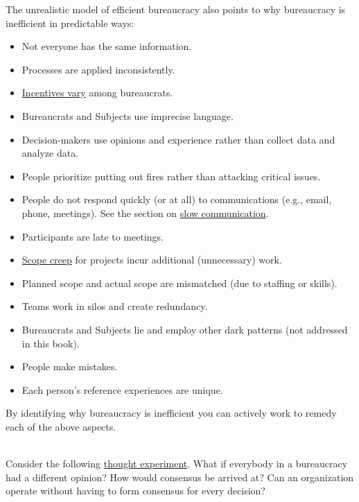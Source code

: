 The unrealistic model of efficient bureaucracy also points to why bureaucracy is inefficient in predictable ways:
\begin{itemize}
    \item Not everyone has the same information.
    \item Processes are applied inconsistently.
    \item \hyperref[sec:motivations]{Incentives vary} among bureaucrats.
    \item Bureaucrats and Subjects use imprecise language.
    \item Decision-makers use opinions and experience rather than collect data and analyze data.
    \item People prioritize putting out fires rather than attacking critical issues.
    \item People do not respond quickly (or at all) to communications (e.g., email, phone, meetings). See the section on \hyperref[sec:slowing-communication]{slow communication}.
    \item Participants are late to meetings.
    \item \hyperref[sec:scope-creep]{Scope creep} 
    for projects incur additional (unnecessary) work.
    \item Planned scope and actual scope are mismatched  (due to staffing or skills).
    \item Teams work in silos and create redundancy.
    \item Bureaucrats and Subjects lie and employ other dark patterns (not addressed in this book).
    \item People make mistakes.
    \item Each person's reference experiences are unique.
\end{itemize}
By identifying why bureaucracy is inefficient you can actively work to remedy each of the above aspects. 

\ \\

Consider the following 
\href{https://en.wikipedia.org/wiki/Thought_experiment}{thought experiment}. 
What if everybody in a bureaucracy had a different opinion? How would consensus be arrived at? Can an organization operate without having to form consensus for every decision? 



